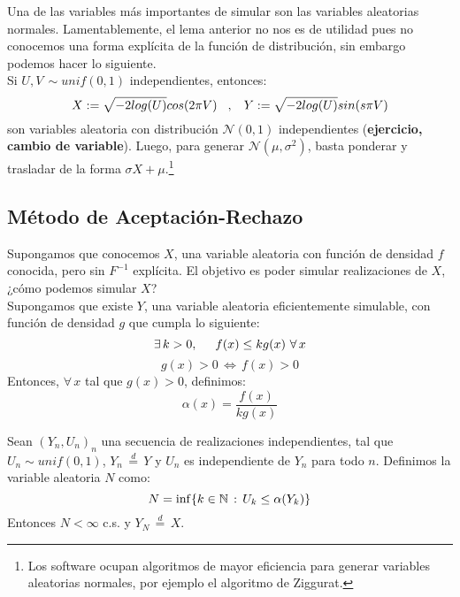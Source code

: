 Una de las variables más importantes de simular son las variables aleatorias normales. Lamentablemente, el lema anterior no nos es de utilidad pues no conocemos una forma explícita de la función de distribución, sin embargo podemos hacer lo siguiente.\\ Si $U,V\,\sim unif(0,1)$ independientes, entonces:
\[X:= \sqrt{-2log(U)}cos(2\pi V)\hspace{0.3cm},\hspace{0.3cm}Y:=\sqrt{-2log(U)}sin(s\pi V)\]
son variables aleatoria con distribución $\mathcal{N}(0,1)$ independientes (\textbf{ejercicio, cambio de variable}). Luego, para generar $\mathcal{N}(\mu,\sigma^2)$, basta ponderar y trasladar de la forma $\sigma X + \mu$.\footnote{Los software ocupan algoritmos de mayor eficiencia para generar variables aleatorias normales, por ejemplo el algoritmo de Ziggurat.}

\subsection{Método de Aceptación-Rechazo}
Supongamos que conocemos $X$, una variable aleatoria con función de densidad $f$ conocida, pero sin $F^{-1}$ explícita. El objetivo es poder simular realizaciones de $X$, ¿cómo podemos simular $X$?\\ Supongamos que existe $Y$, una variable aleatoria eficientemente simulable, con función de densidad $g$ que cumpla lo siguiente:
\[\exists\,k>0,\hspace{0.5cm}f(x)\leq kg(x)\,\,\forall\,x\]
\[g(x)>0\,\Longleftrightarrow\,f(x)>0\]
Entonces, $\forall\,x$ tal que $g(x)>0$, definimos:
\begin{equation}
    \alpha(x) = \frac{f(x)}{kg(x)}
    \label{eq.alpha de x}
\end{equation}

\begin{prop} Sean $(Y_n,U_n)_n$ una secuencia de realizaciones independientes, tal que $U_n\sim unif(0,1)$, $Y_n\,\overset{d}{=}\,Y$ y $U_n$ es independiente de $Y_n$ para todo $n$. Definimos la variable aleatoria $N$ como:
\[N=\inf\{k\in\mathbb N\,:\,U_k \leq \alpha(Y_k)\}\]
Entonces $N<\infty$ c.s. y $Y_N \,\overset{d}{=}\,X$.
\end{prop}

